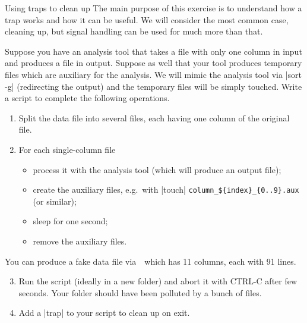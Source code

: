 
\begin{exercise}[Instructive]{Using traps to clean up}
    The main purpose of this exercise is to understand how a trap works and how it can be useful.
    We will consider the most common case, cleaning up, but signal handling can be used for much more than that.
    
    Suppose you have an analysis tool that takes a file with only one column in input and produces a file in output.
    Suppose as well that your tool produces temporary files which are auxiliary for the analysis.
    We will mimic the analysis tool via \bash|sort -g| (redirecting the output) and the temporary files will be simply touched.
    Write a script to complete the following operations.
    \begin{enumerate}
        \item Split the data file into several files, each having one column of the original file.
        \item For each single-column file
              \begin{itemize}
                  \item process it with the analysis tool (which will produce an output file);
                  \item create the auxiliary files, e.g.\ with \bash|touch| \texttt{column\_\$\{index\}\_\{0..9\}.aux} (or similar);
                  \item sleep for one second;
                  \item remove the auxiliary files.
              \end{itemize}
    \end{enumerate}
    You can produce a fake data file via \,\, which has 11 columns, each with 91 lines.
    \begin{enumerate}
        \setcounter{enumi}{2}
        \item Run the script (ideally in a new folder) and abort it with CTRL-C after few seconds.
              Your folder should have been polluted by a bunch of files.
        \item Add a \bash|trap| to your script to clean up on exit.
    \end{enumerate}
\end{exercise}